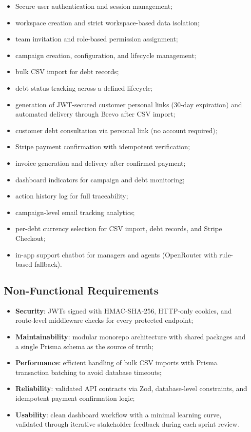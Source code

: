 \documentclass[12pt,a4paper]{report}
\begin{document}
\begin{itemize}
  \item Secure user authentication and session management;
  \item workspace creation and strict workspace-based data isolation;
  \item team invitation and role-based permission assignment;
  \item campaign creation, configuration, and lifecycle management;
  \item bulk CSV import for debt records;
  \item debt status tracking across a defined lifecycle;
  \item generation of JWT-secured customer personal links (30-day expiration) and
        automated delivery through Brevo after CSV import;
  \item customer debt consultation via personal link (no account required);
  \item Stripe payment confirmation with idempotent verification;
  \item invoice generation and delivery after confirmed payment;
  \item dashboard indicators for campaign and debt monitoring;
  \item action history log for full traceability;
  \item campaign-level email tracking analytics;
  \item per-debt currency selection for CSV import, debt records, and Stripe
        Checkout;
  \item in-app support chatbot for managers and agents (OpenRouter with rule-based
        fallback).
\end{itemize}

\subsection{Non-Functional Requirements}

\begin{itemize}
  \item \textbf{Security}: JWTs signed with HMAC-SHA-256, HTTP-only cookies,
        and route-level middleware checks for every protected endpoint;
  \item \textbf{Maintainability}: modular monorepo architecture with shared
        packages and a single Prisma schema as the source of truth;
  \item \textbf{Performance}: efficient handling of bulk CSV imports with Prisma
        transaction batching to avoid database timeouts;
  \item \textbf{Reliability}: validated API contracts via Zod, database-level
        constraints, and idempotent payment confirmation logic;
  \item \textbf{Usability}: clean dashboard workflow with a minimal learning curve,
        validated through iterative stakeholder feedback during each sprint review.
\end{itemize}
\end{document}

